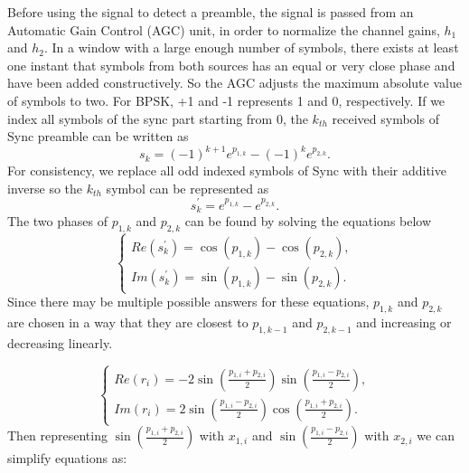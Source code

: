 
Before using the signal to detect a preamble, the signal is passed from an Automatic Gain Control (AGC) unit, in order to normalize the channel gains, $h_1$ and $h_2$.  In a window with a large enough number of symbols, there exists at least one instant that symbols from both sources has an equal or very close phase and have been added constructively. So the AGC adjusts the maximum absolute value of symbols to two. For BPSK,  +1 and -1 represents 1 and 0, respectively. If we index all symbols of the sync part starting from 0, the $k_{th}$ received symbols of Sync preamble can be written as
\begin{equation} \label{maineq}
    s_k=(-1)^{k+1}e^{p_{1,k}} - (-1)^{k}e^{p_{2,k}}.
\end{equation}
For  consistency, we replace all odd indexed symbols of Sync with their additive inverse so the $k_{th}$ symbol can be represented as
\begin{equation}
    s_k^\prime=e^{p_{1,k}} - e^{p_{2,k}}.
\end{equation}
The two phases of $p_{1,k}$ and $p_{2,k}$ can be found by solving the equations below
\begin{equation}
\begin{cases}
    Re(s_k^\prime)=\cos(p_{1,k}) - \cos(p_{2,k}), \\
    Im(s_k^\prime)=\sin(p_{1,k}) - \sin(p_{2,k}).
\end{cases} 
\end{equation}
Since there may be multiple possible answers for these equations,  $p_{1,k}$ and $p_{2,k}$ are chosen in a way that they are closest to $p_{1,k-1}$ and $p_{2,k-1}$ and increasing or decreasing linearly. 

\iffalse
\begin{equation}
\begin{cases}
    Re(r_i)=-2\sin \left( \frac{p_{1,i}+p_{2,i}}{2}\right)  \sin \left( \frac{p_{1,i}-p_{2,i}}{2}\right), \\
    Im(r_i)=2\sin \left( \frac{p_{1,i}-p_{2,i}}{2}\right)   \cos \left( \frac{p_{1,i}+p_{2,i}}{2}\right).
\end{cases} 
\end{equation}
Then representing $\sin \left( \frac{p_{1,i}+p_{2,i}}{2}\right)$ with $x_{1,i}$ and $\sin \left( \frac{p_{1,i}-p_{2,i}}{2}\right)$ with $x_{2,i}$ we can simplify equations as:

